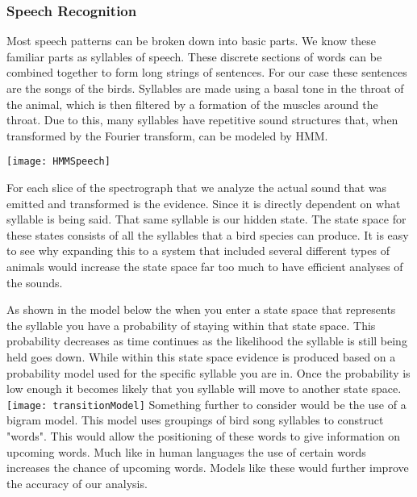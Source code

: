 \subsubsection{Speech Recognition}
\par Most speech patterns can be broken down into basic parts. We know these familiar parts as syllables of speech. These discrete sections of words can be combined together to form long strings of sentences. For our case these sentences are the songs of the birds. Syllables are made using a basal tone in the throat of the animal, which is then filtered by a formation of the muscles around the throat.
Due to this, many syllables have repetitive sound structures that, when transformed by the Fourier transform, can be modeled by HMM.
\begin{center}
\texttt{[image: HMMSpeech]}
\end{center}
\par For each slice of the spectrograph that we analyze the actual sound that was emitted and transformed is the evidence. Since it is directly dependent on what syllable is being said. That same syllable is our hidden state. The state space for these states consists of all the syllables that a bird species can produce. It is easy to see why expanding this to a system that included several different types of animals would increase the state space far too much to have efficient analyses of the sounds. 
\par As shown in the model below the when you enter a state space that represents the syllable you have a probability of staying within that state space. This probability decreases as time continues as the likelihood the syllable is still being held goes down. While within this state space evidence is produced based on a probability model used for the specific syllable you are in. Once the probability is low enough it becomes likely that you syllable will move to another state space.
\texttt{[image: transitionModel]}
Something further to consider would be the use of a bigram model. This model uses groupings of bird song syllables to construct "words". This would allow the positioning of these words to give information on upcoming words. Much like in human languages the use of certain words increases the chance of upcoming words. Models like these would further improve the accuracy of our analysis.  


